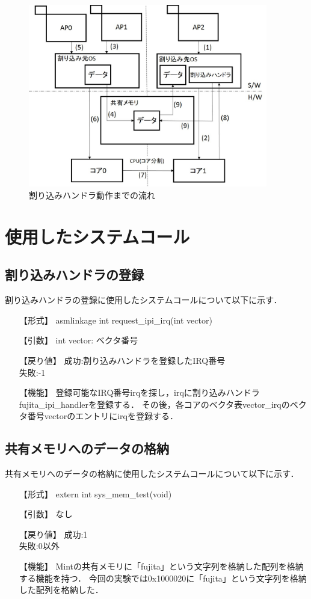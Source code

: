 \documentclass[12pt]{jsarticle}
\begin{document}
\begin{figure}[t]
\begin{center}
\includegraphics[height=8.0cm]{./fig1.jpg}
\caption{割り込みハンドラ動作までの流れ}
\label{fig:up}
\end{center}
\end{figure}


\section{使用したシステムコール}
\subsection{割り込みハンドラの登録}
割り込みハンドラの登録に使用したシステムコールについて以下に示す．
\begin{itemize}
\item [【形式】] asmlinkage int request\_ipi\_irq(int vector)
\item [【引数】] int vector: ベクタ番号
\item [【戻り値】] 成功:割り込みハンドラを登録したIRQ番号\\失敗:-1
\item [【機能】] 登録可能なIRQ番号irqを探し，irqに割り込みハンドラfujita\_ipi\_handlerを登録する．
その後，各コアのベクタ表vector\_irqのベクタ番号vectorのエントリにirqを登録する．
\end{itemize}
\subsection{共有メモリへのデータの格納}
共有メモリへのデータの格納に使用したシステムコールについて以下に示す．

\begin{itemize}
\item [【形式】] extern int sys\_mem\_test(void)
\item [【引数】] なし
\item [【戻り値】] 成功:1\\失敗:0以外
\item [【機能】] Mintの共有メモリに「fujita」という文字列を格納した配列を格納する機能を持つ．
今回の実験では0x1000020に「fujita」という文字列を格納した配列を格納した．
\end{itemize}
\end{document}
